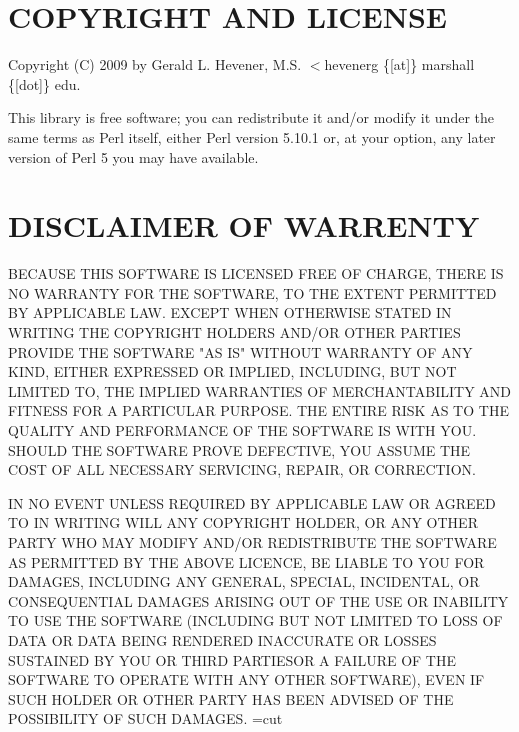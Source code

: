\section{COPYRIGHT AND LICENSE\label{COPYRIGHT_AND_LICENSE}}


Copyright (C) 2009 by Gerald L. Hevener, M.S. $<$hevenerg \{[at]\} marshall \{[dot]\} edu.



This library is free software; you can redistribute it and/or modify
it under the same terms as Perl itself, either Perl version 5.10.1 or,
at your option, any later version of Perl 5 you may have available.

\section{DISCLAIMER OF WARRENTY\label{DISCLAIMER_OF_WARRENTY}}


BECAUSE THIS SOFTWARE IS LICENSED FREE OF CHARGE, THERE IS NO WARRANTY FOR THE SOFTWARE, TO THE EXTENT PERMITTED BY APPLICABLE LAW. EXCEPT WHEN OTHERWISE STATED IN WRITING THE COPYRIGHT HOLDERS AND/OR OTHER PARTIES PROVIDE THE SOFTWARE "AS IS" WITHOUT WARRANTY OF ANY KIND, EITHER EXPRESSED OR IMPLIED, INCLUDING, BUT NOT LIMITED TO, THE IMPLIED WARRANTIES OF MERCHANTABILITY AND FITNESS FOR A PARTICULAR PURPOSE. THE ENTIRE RISK AS TO THE QUALITY AND PERFORMANCE OF THE SOFTWARE IS WITH YOU. SHOULD THE SOFTWARE PROVE DEFECTIVE, YOU ASSUME THE COST OF ALL NECESSARY SERVICING, REPAIR, OR CORRECTION.



IN NO EVENT UNLESS REQUIRED BY APPLICABLE LAW OR AGREED TO IN WRITING WILL ANY COPYRIGHT HOLDER, OR ANY OTHER PARTY WHO MAY MODIFY AND/OR REDISTRIBUTE THE SOFTWARE AS PERMITTED BY THE ABOVE LICENCE, BE LIABLE TO YOU FOR DAMAGES, INCLUDING ANY GENERAL, SPECIAL, INCIDENTAL, OR CONSEQUENTIAL DAMAGES ARISING OUT OF THE USE OR INABILITY TO USE THE SOFTWARE (INCLUDING BUT NOT LIMITED TO LOSS OF DATA OR DATA BEING RENDERED INACCURATE OR LOSSES SUSTAINED BY YOU OR THIRD PARTIESOR A FAILURE OF THE SOFTWARE TO OPERATE WITH ANY OTHER SOFTWARE), EVEN IF SUCH HOLDER OR OTHER PARTY HAS BEEN ADVISED OF THE POSSIBILITY OF SUCH DAMAGES.
=cut

